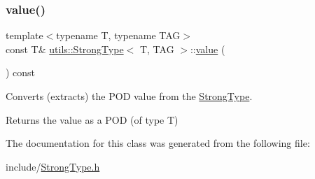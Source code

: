 \subsubsection{\texorpdfstring{value()}{value()}}
{\footnotesize\ttfamily template$<$typename T, typename T\+AG$>$ \\
const T\& \mbox{\hyperlink{classutils_1_1_strong_type}{utils\+::\+Strong\+Type}}$<$ T, T\+AG $>$\+::\mbox{\hyperlink{diffusion_8cpp_a4b41795815d9f3d03abfc739e666d5da}{value}} (\begin{DoxyParamCaption}{ }\end{DoxyParamCaption}) const\hspace{0.3cm}{\ttfamily [inline]}}



Converts (extracts) the P\+OD value from the \mbox{\hyperlink{classutils_1_1_strong_type}{Strong\+Type}}. 

\begin{DoxyReturn}{Returns}
the value as a P\+OD (of type T) 
\end{DoxyReturn}


The documentation for this class was generated from the following file\+:\begin{DoxyCompactItemize}
\item 
include/\mbox{\hyperlink{_strong_type_8h}{Strong\+Type.\+h}}\end{DoxyCompactItemize}
